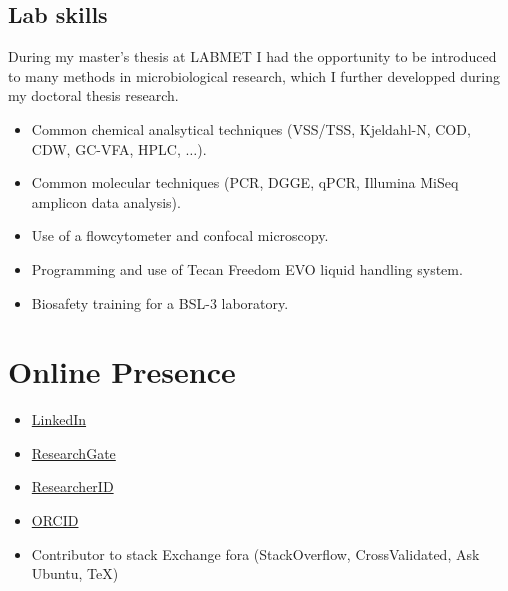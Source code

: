 \documentclass[a4paper,11pt,oneside]{article}
\begin{document}
\subsection*{Lab skills}
During my master's thesis at LABMET I had the opportunity to be introduced to many methods in microbiological research, which I further developped during my doctoral thesis research.
\begin{itemize}
	\item Common chemical analsytical techniques (VSS/TSS, Kjeldahl-N, COD, CDW, GC-VFA, HPLC, $\ldots$).
	\item Common molecular techniques (PCR, DGGE, qPCR, Illumina MiSeq amplicon data analysis).
	\item Use of a flowcytometer and confocal microscopy.
  \item Programming and use of Tecan Freedom EVO liquid handling system.
	\item Biosafety training for a BSL-3 laboratory.
\end{itemize}
\section*{Online Presence}
\begin{itemize}
  \item \href{https://www.linkedin.com/pub/frederiek-maarten-kerckhof/26/b47/668}{LinkedIn}
  \item \href{https://www.researchgate.net/profile/Frederiek-Maarten_Kerckhof}{ResearchGate}
  \item \href{http://www.researcherid.com/ProfileView.action?SID=V2bGbhtEe1TlsfIEXBz&returnCode=ROUTER.Success&queryString=KG0UuZjN5WlUD2sX8KoC12Tw17vPT2A6ocQ5tgzRDDI\%253D\&SrcApp=CR\&Init=Yes}{ResearcherID}
  \item \href{http://orcid.org/0000-0002-4472-6810}{ORCID}
  \item Contributor to stack Exchange fora (StackOverflow, CrossValidated, Ask Ubuntu, TeX)
\end{itemize}

\renewcommand{\refname}{Academic publications} %
\renewcommand{\bibname}{Academic publications} %
\nocite{*}


%
\end{document}
